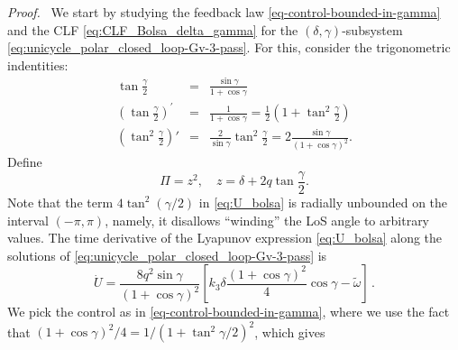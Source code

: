 \documentclass[journal,twoside,web]{ieeecolor}
\theoremstyle{definition}
\renewenvironment{proof}[1][Proof]{\par\pushQED{\qed}\normalfont\textit{#1.}~}{\popQED\par}
\begin{document}
\begin{proof}
We start by studying the feedback law \eqref{eq-control-bounded-in-gamma} and the CLF \eqref{eq:CLF_Bolsa_delta_gamma} for the $(\delta, \gamma)$-subsystem   \eqref{eq:unicycle_polar_closed_loop-Gv-3-pass}. For this, consider the trigonometric indentities:
\begin{eqnarray}
\tan\frac{\gamma}{2} &=& \frac{\sin\gamma}{1+\cos\gamma} \label{eq:trig_identity_1}
\\
\left(\tan\frac{\gamma}{2}\right)^\prime &=& \frac{1}{1+\cos\gamma}  = \frac{1}{2}\left(1+\tan^2\frac{\gamma}{2}\right) \label{eq:trig_identity_2}
\\
\left(\tan^2\frac{\gamma}{2}\right)' &=& \frac{2 }{\sin \gamma} \tan^2 \frac{\gamma}{2} =
2 \frac{\sin\gamma}{(1+\cos\gamma)^2}. \label{eq:trig_identity_3}
\end{eqnarray}
Define
\begin{equation}
\Pi = z^2, \quad  z = \delta + 2 q \tan\frac{\gamma}{2}. 
\end{equation}
Note that the term $4\tan^2 (\gamma/2)$ in \eqref{eq:U_bolsa} is radially unbounded on the interval $(-\pi,\pi)$, namely, it disallows ``winding'' the LoS angle to arbitrary values. 
The time derivative of the Lyapunov expression \eqref{eq:U_bolsa} along the solutions of \eqref{eq:unicycle_polar_closed_loop-Gv-3-pass} is
\begin{equation}
\dot U  =  \frac{8 q^2 \sin\gamma}{(1+\cos\gamma)^2} \left[ k_3 \delta \frac{(1+\cos\gamma)^2}{4} \cos\gamma 
- \tilde{\omega}\right]\,.
\end{equation}
We pick the control as in \eqref{eq-control-bounded-in-gamma}, where we use the fact that $(1+\cos\gamma)^2/4 = 1/(1+\tan^2 \gamma/2)^2$, which gives
\begin{equation}

\end{equation}
\end{proof}
\end{document}
